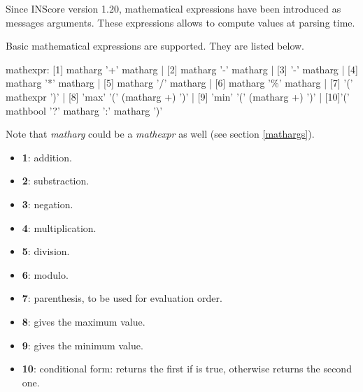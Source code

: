 

\newcommand{\inscoremathversion}{1.20}
\newcommand{\mathstring}[1]		{\textit{string}(\OSC{#1})}
\newcommand{\mathstrnum}[1]		{\textit{length}(\OSC{#1})}
\newcommand{\mathsize}[1]		{\textit{size}(\OSC{#1})}
\newcommand{\op}				{$op$}
\newcommand{\todo}	[1]			{{\big [\texttt{\textbf{#1}}]}}

\label{mathExpr}

Since INScore version \inscoremathversion , mathematical expressions have been introduced as messages arguments. These expressions allows to compute values at parsing time.

\label{Operators}

Basic mathematical expressions are supported. They are listed below.


\begin{rail}
mathexpr:     [1] matharg '+' matharg
			| [2] matharg '-' matharg
			| [3] '-' matharg
			| [4] matharg '*' matharg
			| [5] matharg '/' matharg
			| [6] matharg '\%' matharg
			| [7] '(' mathexpr ')'
			| [8] 'max' '(' (matharg +) ')'
			| [9] 'min' '(' (matharg +) ')'
			| [10]'(' mathbool '?' matharg ':' matharg ')'
\end{rail}

Note that \textit{matharg} could be a \textit{mathexpr} as well (see section \ref{mathargs}).

\begin{itemize}
\item \textbf{1}: addition.
\item \textbf{2}: substraction.
\item \textbf{3}: negation.
\item \textbf{4}: multiplication.
\item \textbf{5}: division.
\item \textbf{6}: modulo.
\item \textbf{7}: parenthesis, to be used for evaluation order.
\item \textbf{8}: gives the maximum value.
\item \textbf{9}: gives the minimum value.
\item \textbf{10}: conditional form: returns the first  if  is true, otherwise returns the second one.
\end{itemize}

